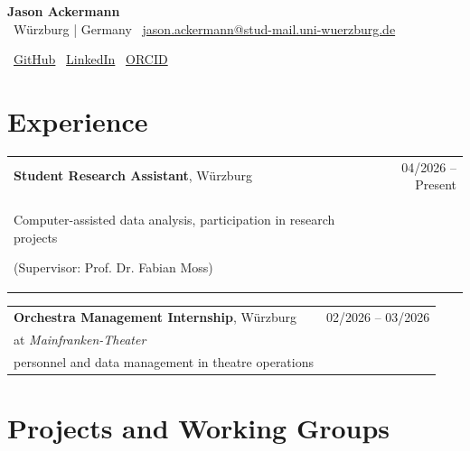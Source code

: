 \documentclass[11pt,a4paper]{article}
\begin{document}
\begin{center}
    {\LARGE \textbf{Jason Ackermann}}\\[0.6em]

    \faMapMarker*~Würzburg | Germany
    \quad
    \faEnvelope~\href{mailto:jason.ackermann@stud-mail.uni-wuerzburg.de}{jason.ackermann@stud-mail.uni-wuerzburg.de}
    \quad

    \faGithub~\href{https://github.com/jasonvla}{GitHub}
    \quad
    \faLinkedin~\href{https://www.linkedin.com/in/jason-ackermann-b9b316285/}{LinkedIn}
    \faOrcid~\href{https://orcid.org/0009-0000-2351-1071}{ORCID}
\end{center}
\section{Experience}

\begin{tabularx}{\textwidth}{X r}
\textbf{Student Research Assistant}, Würzburg & 04/2026 -- Present\\
Computer-assisted data analysis, participation in research projects 

(Supervisor: Prof. Dr. Fabian Moss) & \\
\end{tabularx}

\begin{tabularx}{\textwidth}{X r}
\textbf{Orchestra Management Internship}, Würzburg & 02/2026 -- 03/2026\\
at \textit{Mainfranken-Theater}  \\
personnel and data management in theatre operations & \\
\end{tabularx}

\section{Projects and Working Groups}
\end{document}
